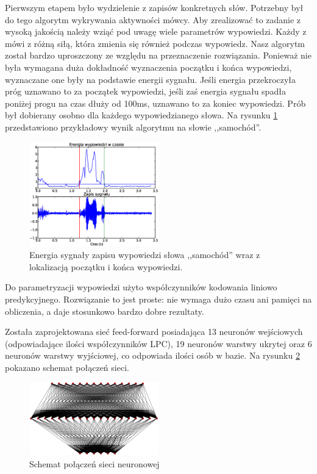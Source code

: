 \documentclass[journal]{IEEEtran}
\begin{document}
Pierwszym etapem było wydzielenie z zapisów konkretnych słów. Potrzebny był do
tego algorytm wykrywania aktywności mówcy. Aby zrealizować to zadanie z wysoką
jakością należy wziąć pod uwagę wiele parametrów wypowiedzi. Każdy z mówi z
różną siłą, która zmienia się również podczas wypowiedz. Nasz algorytm został
bardzo uproszczony ze względu na przeznaczenie rozwiązania. Ponieważ nie była
wymagana duża dokładność wyznaczenia początku i końca wypowiedzi, wyznaczane
one były na podstawie energii sygnału. Jeśli energia przekroczyła próg uznawano
to za początek wypowiedzi, jeśli zaś energia sygnału spadła poniżej progu na
czas dłuży od 100ms, uznawano to za koniec wypowiedzi. Prób był dobierany
osobno dla każdego wypowiedzianego słowa. Na rysunku \ref{fig:say}
przedstawiono przykładowy wynik algorytmu na słowie ,,samochód''.

\begin{figure}[h!]
    \includegraphics[width=0.5\textwidth]{say_samochod}
    \caption{Energia sygnały zapisu wypowiedzi słowa ,,samochód'' wraz z
    lokalizacją początku i końca wypowiedzi.}
    \label{fig:say}
\end{figure}

Do parametryzacji wypowiedzi użyto współczynników kodowania liniowo predykcyjnego.
Rozwiązanie to jest proste: nie wymaga dużo czasu ani pamięci na obliczenia, a
daje stosunkowo bardzo dobre rezultaty.

Została zaprojektowana sieć feed-forward posiadająca 13 neuronów wejściowych
(odpowiadające ilości współczynników LPC), 19 neuronów warstwy ukrytej oraz 6
neuronów warstwy wyjściowej, co odpowiada ilości osób w bazie. Na rysunku
\ref{fig:network} pokazano schemat połączeń sieci.

\begin{figure}
    \includegraphics[width=0.5\textwidth]{network}
    \caption{Schemat połączeń sieci neuronowej}
    \label{fig:network}
\end{figure}
\end{document}
